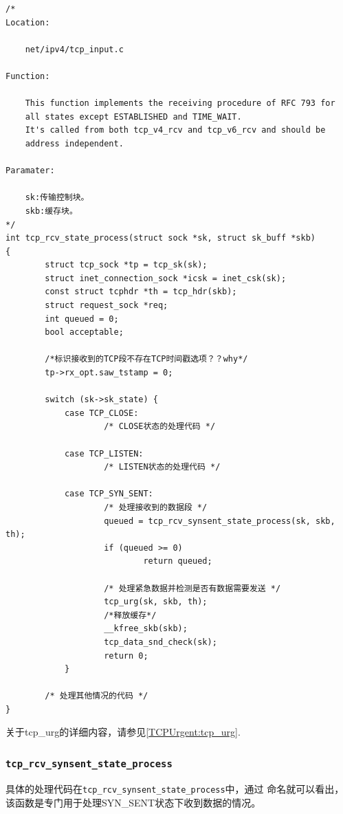 \begin{verbatim}
/*
Location:

    net/ipv4/tcp_input.c

Function:

    This function implements the receiving procedure of RFC 793 for
    all states except ESTABLISHED and TIME_WAIT.
    It's called from both tcp_v4_rcv and tcp_v6_rcv and should be
    address independent.

Paramater:

    sk:传输控制块。
    skb:缓存块。
*/
int tcp_rcv_state_process(struct sock *sk, struct sk_buff *skb)
{
        struct tcp_sock *tp = tcp_sk(sk);
        struct inet_connection_sock *icsk = inet_csk(sk);
        const struct tcphdr *th = tcp_hdr(skb);
        struct request_sock *req;
        int queued = 0;
        bool acceptable;

        /*标识接收到的TCP段不存在TCP时间戳选项？？why*/
        tp->rx_opt.saw_tstamp = 0;

        switch (sk->sk_state) {
            case TCP_CLOSE:
                    /* CLOSE状态的处理代码 */

            case TCP_LISTEN:
                    /* LISTEN状态的处理代码 */

            case TCP_SYN_SENT:
                    /* 处理接收到的数据段 */
                    queued = tcp_rcv_synsent_state_process(sk, skb, th);
                    if (queued >= 0)
                            return queued;

                    /* 处理紧急数据并检测是否有数据需要发送 */
                    tcp_urg(sk, skb, th);
					/*释放缓存*/
                    __kfree_skb(skb);
                    tcp_data_snd_check(sk);
                    return 0;
            }

        /* 处理其他情况的代码 */
}
\end{verbatim}

	关于tcp\_urg的详细内容，请参见\ref{TCPUrgent:tcp_urg}.

    \subsubsection{\texttt{tcp_rcv_synsent_state_process}}
		\label{SYN+ACK:tcp_rcv_synsent_state_process}
        具体的处理代码在\texttt{tcp_rcv_synsent_state_process}中，通过
        命名就可以看出，该函数是专门用于处理SYN\_SENT状态下收到数据的情况。

